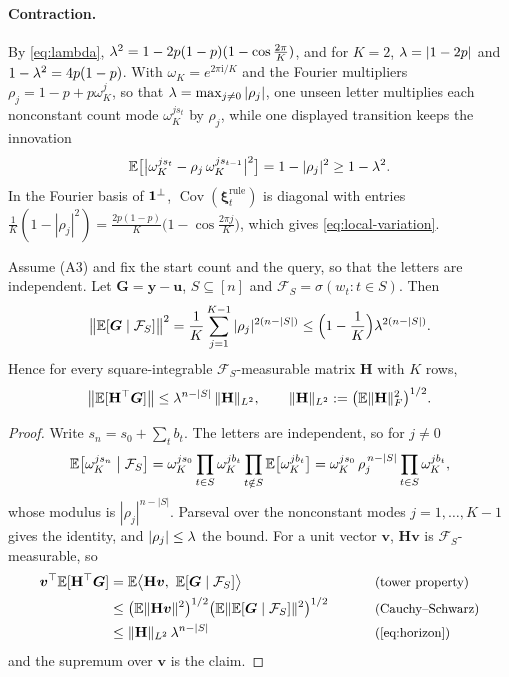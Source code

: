 \paragraph{Contraction.}\label{app:contraction} By \cref{eq:lambda}, $\mixrate^2=1-2p(1-p)(1-\cos\tfrac{2\pi}{K})$, and for $K=2$,
$\lambda=|1-2p|$ and $1-\lambda^2=4p(1-p)$. With $\omega_K=e^{2\pi\mathrm i/K}$ and the Fourier multipliers
$\rho_j=1-p+p\omega_K^j$, so that $\lambda=\max_{j\ne0}|\rho_j|$, one unseen letter multiplies each nonconstant count
mode $\omega_K^{js_t}$ by $\rho_j$, while one displayed transition keeps the innovation
\begin{equation}
 \mathbb E\bigl[\bigl|\omega_K^{j s_t}-\rho_j\,\omega_K^{j s_{t-1}}\bigr|^2\bigr]=1-|\rho_j|^2\ge1-\lambda^2 .
 \label{eq:move-variance}
\end{equation}
In the Fourier basis of $\mathbf 1^\perp$, $\operatorname{Cov}(\bm\xi^{\mathrm{rule}}_t)$ is diagonal with entries $\tfrac{1}{K}(1-|\rho_j|^2)=\tfrac{2p(1-p)}{K}\bigl(1-\cos\tfrac{2\pi j}{K}\bigr)$,
which gives \cref{eq:local-variation}.

\begin{lemma}
\label{lem:target-contraction}
Assume (A3) and fix the start count and the query, so that the letters are independent. Let $\bm G=\bm y-\bm u$, $S\subseteq[n]$ and $\mathcal F_S=\sigma(w_t:t\in S)$. Then
\begin{equation}
 \bigl\|\mathbb E[\bm G\mid\mathcal F_S]\bigr\|^2=\frac{1}{K}\sum_{j=1}^{K-1}|\rho_j|^{2(n-|S|)}\le\Bigl(1-\frac{1}{K}\Bigr)\lambda^{2(n-|S|)} .
 \label{eq:horizon}
\end{equation}
Hence for every square-integrable $\mathcal F_S$-measurable matrix $\mathbf H$ with $K$ rows,
\[
 \bigl\|\mathbb E[\mathbf H^\top\bm G]\bigr\|\le\lambda^{n-|S|}\,\|\mathbf H\|_{L^2},\qquad \|\mathbf H\|_{L^2}:=\bigl(\mathbb E\|\mathbf H\|_F^2\bigr)^{1/2}.
\]
\end{lemma}

\begin{proof}
Write $s_n=s_0+\sum_tb_t$. The letters are independent, so for $j\ne0$
\[
 \mathbb E\bigl[\omega_K^{js_n}\bigm|\mathcal F_S\bigr]=\omega_K^{js_0}\prod_{t\in S}\omega_K^{jb_t}\prod_{t\notin S}\mathbb E\bigl[\omega_K^{jb_t}\bigr]=\omega_K^{js_0}\,\rho_j^{\,n-|S|}\prod_{t\in S}\omega_K^{jb_t},
\]
whose modulus is $|\rho_j|^{n-|S|}$. Parseval over the nonconstant modes $j=1,\ldots,K-1$ gives the identity, and $|\rho_j|\le\lambda$ the bound.
For a unit vector $\bm v$, $\mathbf H\bm v$ is $\mathcal F_S$-measurable, so
\begin{alignat*}{2}
 \bm v^\top\E[\mathbf H^\top\bm G]&=\E\bigl\langle\mathbf H\bm v,\ \E[\bm G\mid\mathcal F_S]\bigr\rangle &\qquad& \why{tower property}\\
 &\le\bigl(\E\|\mathbf H\bm v\|^2\bigr)^{1/2}\bigl(\E\|\E[\bm G\mid\mathcal F_S]\|^2\bigr)^{1/2} && \why{Cauchy--Schwarz}\\
 &\le\|\mathbf H\|_{L^2}\,\mixrate^{n-|S|} && \why{\cref{eq:horizon}}
\end{alignat*}
and the supremum over $\bm v$ is the claim.
\end{proof}

